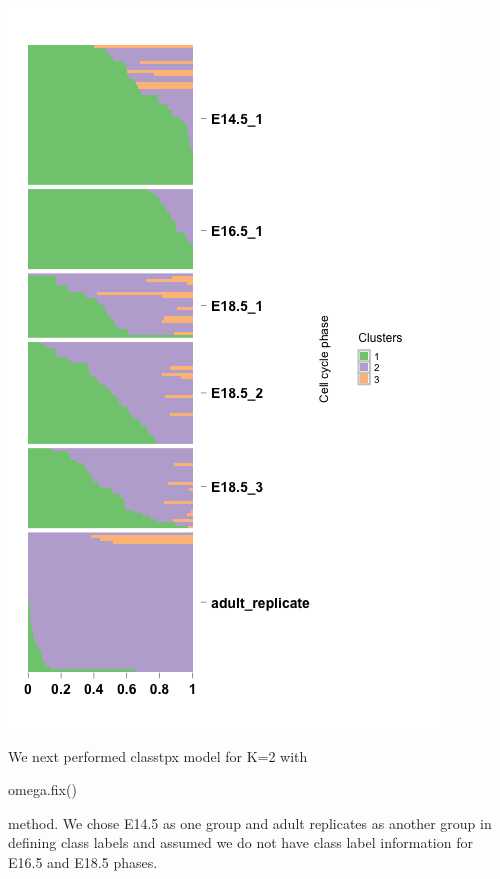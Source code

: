 \documentclass[12pt]{article}
\begin{document}
\begin{knitrout}
\begin{kframe}
\begin{alltt}
\hlopt{::}\hlstd{(} 
                 
                 \hlopt{::}\hlstd{(}\hlstd{,} \hlstd{),}
                 \hlstd{=} \hlstd{,}
                 \hlstd{=} \hlstd{,}
                 \hlstd{=} \hlstd{(} \hlstd{=} \hlstd{,}
                                  \hlstd{=} \hlstd{,}
                                  \hlstd{=} \hlstd{,}
                                  \hlstd{=} \hlstd{,}
                                  \hlstd{=} \hlstd{))}
\end{alltt}
\end{kframe}
\includegraphics[width=3 in,height=5 in]{figure/structure_treutlin_maptpx-1} 

\end{knitrout}

We next performed classtpx model for K=2  with \begin{verb} omega.fix() \end{verb} method.
We chose E14.5 as one group and adult replicates as another group in defining class labels and
assumed we do not have class label information for E16.5 and E18.5 phases.
\end{document}
